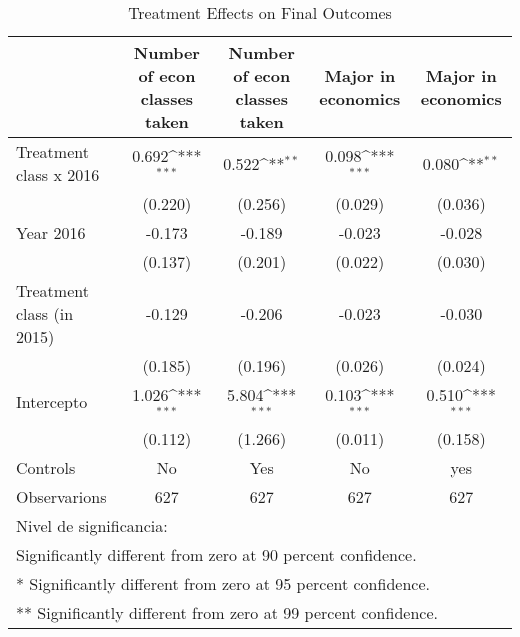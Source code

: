\begin{table}[]
\caption{Treatment Effects on Final Outcomes}
{
\def\sym#1{\ifmmode^{#1}\else\(^{#1}\)\fi}
\begin{tabular}{@{\extracolsep{2pt}}l*{4}{c}@{}}
\hline\hline


 & Number of econ classes taken & Number of econ classes taken & Major in economics & Major in economics \\
\hline
Treatment class x 2016 & 0.692\sym{***} & 0.522\sym{**} & 0.098\sym{***} & 0.080\sym{**} \\
 & (0.220) & (0.256) & (0.029) & (0.036) \\
Year 2016 & -0.173 & -0.189 & -0.023 & -0.028 \\
 & (0.137) & (0.201) & (0.022) & (0.030) \\
Treatment class (in 2015) & -0.129 & -0.206 & -0.023 & -0.030 \\
 & (0.185) & (0.196) & (0.026) & (0.024) \\
Intercepto & 1.026\sym{***} & 5.804\sym{***} & 0.103\sym{***} & 0.510\sym{***} \\
 & (0.112) & (1.266) & (0.011) & (0.158) \\
Controls & No & Yes & No & yes \\

\hline
Observarions & 627 & 627 & 627 & 627 \\
\hline\hline
\multicolumn{5}{l}{\footnotesize Nivel de significancia:}\vspace{-.25em} \\
\multicolumn{5}{l}{\footnotesize * Significantly different from zero at 90 percent confidence.}\vspace{-.25em} \\
\multicolumn{5}{l}{\footnotesize ** Significantly different from zero at 95 percent confidence.}\vspace{-.25em} \\
\multicolumn{5}{l}{\footnotesize *** Significantly different from zero at 99 percent confidence.}
\end{tabular}
}
\end{table}